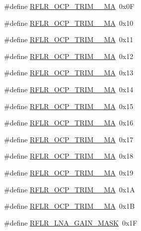 \begin{DoxyCompactItemize}
\item 
\#define \hyperlink{sx1276Regs-LoRa_8h_aab5037b9ac3e1bc7e2eedccf9193ba28}{R\+F\+L\+R\+\_\+\+O\+C\+P\+\_\+\+T\+R\+I\+M\+\_\+\_\+\+MA}~0x0F
\item 
\#define \hyperlink{sx1276Regs-LoRa_8h_a883d12dc95ff98fb03fc31ce6ddc2811}{R\+F\+L\+R\+\_\+\+O\+C\+P\+\_\+\+T\+R\+I\+M\+\_\+\_\+\+MA}~0x10
\item 
\#define \hyperlink{sx1276Regs-LoRa_8h_a6a2eac9941486d2997adb00c19f49d98}{R\+F\+L\+R\+\_\+\+O\+C\+P\+\_\+\+T\+R\+I\+M\+\_\+\_\+\+MA}~0x11
\item 
\#define \hyperlink{sx1276Regs-LoRa_8h_af9d84c5fa6e8da9a6e9cf68ebe748a18}{R\+F\+L\+R\+\_\+\+O\+C\+P\+\_\+\+T\+R\+I\+M\+\_\+\_\+\+MA}~0x12
\item 
\#define \hyperlink{sx1276Regs-LoRa_8h_a3755351c3f7f7842a523b6e7627545fe}{R\+F\+L\+R\+\_\+\+O\+C\+P\+\_\+\+T\+R\+I\+M\+\_\+\_\+\+MA}~0x13
\item 
\#define \hyperlink{sx1276Regs-LoRa_8h_a13dba4245f8c69fe3dee74ebeaad4ed3}{R\+F\+L\+R\+\_\+\+O\+C\+P\+\_\+\+T\+R\+I\+M\+\_\+\_\+\+MA}~0x14
\item 
\#define \hyperlink{sx1276Regs-LoRa_8h_a58209162f626269790dcb91f81340f9d}{R\+F\+L\+R\+\_\+\+O\+C\+P\+\_\+\+T\+R\+I\+M\+\_\+\_\+\+MA}~0x15
\item 
\#define \hyperlink{sx1276Regs-LoRa_8h_a27d3cfb3df1cbf0d08af0ba9e57aae49}{R\+F\+L\+R\+\_\+\+O\+C\+P\+\_\+\+T\+R\+I\+M\+\_\+\_\+\+MA}~0x16
\item 
\#define \hyperlink{sx1276Regs-LoRa_8h_a1979c11cd7ce8b54355954a9e0139de6}{R\+F\+L\+R\+\_\+\+O\+C\+P\+\_\+\+T\+R\+I\+M\+\_\+\_\+\+MA}~0x17
\item 
\#define \hyperlink{sx1276Regs-LoRa_8h_a67bf750125a9cf6cc4137361236ad814}{R\+F\+L\+R\+\_\+\+O\+C\+P\+\_\+\+T\+R\+I\+M\+\_\+\_\+\+MA}~0x18
\item 
\#define \hyperlink{sx1276Regs-LoRa_8h_a3c729a06b76ddb3b25279ab9ec9759bf}{R\+F\+L\+R\+\_\+\+O\+C\+P\+\_\+\+T\+R\+I\+M\+\_\+\_\+\+MA}~0x19
\item 
\#define \hyperlink{sx1276Regs-LoRa_8h_a62fbdb1632a9ef8e2464a411ba6270ac}{R\+F\+L\+R\+\_\+\+O\+C\+P\+\_\+\+T\+R\+I\+M\+\_\+\_\+\+MA}~0x1A
\item 
\#define \hyperlink{sx1276Regs-LoRa_8h_a5b9df1b8ef5dd642212f2da58fff03e3}{R\+F\+L\+R\+\_\+\+O\+C\+P\+\_\+\+T\+R\+I\+M\+\_\+\_\+\+MA}~0x1B
\item 
\#define \hyperlink{sx1276Regs-LoRa_8h_adaf87cfb5bc1842f215a8905466c7c09}{R\+F\+L\+R\+\_\+\+L\+N\+A\+\_\+\+G\+A\+I\+N\+\_\+\+M\+A\+SK}~0x1F

\end{DoxyCompactItemize}
